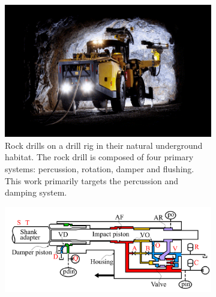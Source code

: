 \begin{figure}[!hbt]
    \begin{center}
        \begin{subfigure}[t]{0.38\linewidth}
        \includegraphics[width=\linewidth, trim=80 80 80 20, clip]{figures/drill_1_min.png}
        \caption{Rock drills on a drill rig in their natural underground habitat. 
        The rock drill is composed of four primary systems: percussion, rotation, damper and flushing. This work primarily targets the percussion and damping system.
        }
        \label{fig:phm_1}
    \end{subfigure}
    \hfill
    \begin{subfigure}[t]{0.6\linewidth}
        \includegraphics[width=\linewidth]{figures/drill_3.png}

\end{subfigure}
\end{center}
\end{figure}
